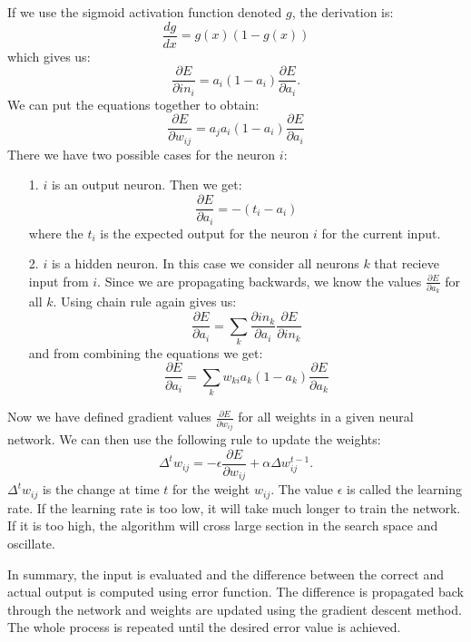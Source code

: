 If we use the sigmoid activation function denoted $g$, the derivation is:
\begin{equation*}
\frac{dg}{dx}  =  g(x)(1-g(x))
\end{equation*}
which gives us:
\begin{equation*}
\frac{\partial E}{\partial in_{i}} = a_{i}(1-a_{i}) \frac{\partial E}{\partial a_{i}}.
\end{equation*}
We can put the equations together to obtain:
\begin{equation*}
\frac{\partial E}{\partial w_{ij}} = a_{j} a_{i}(1-a_{i}) \frac{\partial E}{\partial a_{i}}
\end{equation*}
There we have two possible cases for the neuron $i$:
\begin{enumerate}
\item [1.] $i$ is an output neuron. Then we get: 
	\[
	\frac{\partial E}{\partial a_{i}} = -(t_{i} - a_{i})
	\]
	where the $t_{i}$ is the expected output for the neuron $i$ for the current input.

\item [2.] $i$ is a hidden neuron. In this case we consider all neurons $k$ that recieve input from $i$. Since we are propagating backwards, we know the values $\frac{\partial E}{\partial a_{k}}$ for all $k$. Using chain rule again gives us:
	\[
	\frac{\partial E}{\partial a_{i}} = \sum_{k} \frac{\partial in_{k}}{\partial a_{i}} \frac{\partial E}{\partial in_{k}}
	\]
and from combining the equations we get:
	\[
	\frac{\partial E}{\partial a_{i}} = \sum_{k} w_{ki}a_{k}(1-a_{k}) \frac{\partial E}{\partial a_{k}}
	\]
\end{enumerate}
Now we have defined gradient values $\frac{\partial E}{\partial w_{ij}}$ for all weights in a given neural network.
We can then use the following rule to update the weights:
\[
\Delta^{t} w_{ij} = - \epsilon \frac {\partial E}{\partial w_{ij}} + \alpha \Delta w^{t-1}_{ij}.
\]
$\Delta^{t} w_{ij}$ is the change at time $t$ for the weight $w_{ij}$. The value $\epsilon$ is called the learning rate. If the learning rate is too low, it will take much longer to train the network. If it is too high, the algorithm will cross large section in the search space and  oscillate.

In summary, the input is evaluated and the difference between the correct and actual output is computed using error function. The difference is propagated back through the network and weights are updated using the gradient descent method. The whole process is repeated until the desired error value is achieved.


